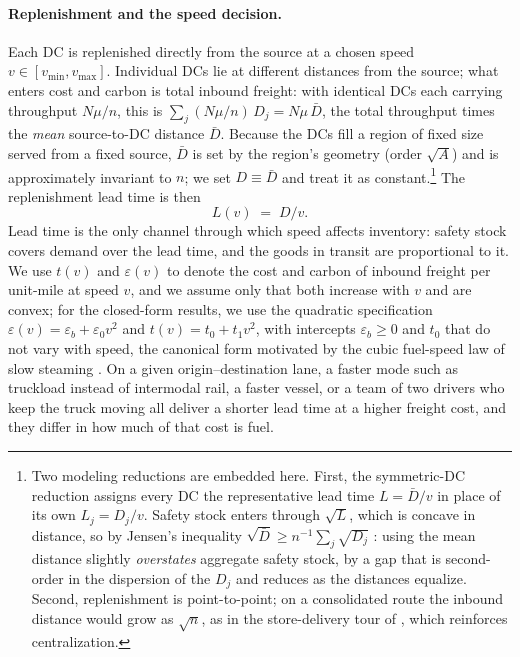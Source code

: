 \documentclass[11pt]{article}
\numberwithin{proposition}{section}
\theoremstyle{definition}
\theoremstyle{remark}
\theoremstyle{plain}
\begin{document}
\paragraph{Replenishment and the speed decision.} Each DC is replenished directly from the source at a chosen
speed $v \in [v_{\min}, v_{\max}]$. Individual DCs lie at different distances from the source; what enters
cost and carbon is total inbound freight: with identical DCs each carrying throughput $N\mu/n$, this is
$\sum_j (N\mu/n)\,D_j = N\mu\,\bar D$, the total throughput times the \emph{mean} source-to-DC distance
$\bar D$. Because the DCs fill a region of fixed
size served from a fixed source, $\bar D$ is set by the region's geometry (order $\sqrt A$) and is
approximately invariant to $n$; we set $D \equiv \bar D$ and treat it as constant.\footnote{Two
modeling reductions are embedded here. First, the symmetric-DC reduction assigns every DC the representative lead
time $L = \bar D/v$ in place of its own $L_j = D_j/v$. Safety stock enters through $\sqrt{L}$, which is
concave in distance, so by Jensen's inequality $\sqrt{\bar D} \ge n^{-1}\sum_j \sqrt{D_j}$
\citep{jensen1906fonctions}: using the mean distance slightly \emph{overstates} aggregate safety stock, by a
gap that is second-order in the dispersion of the $D_j$ and reduces as the distances equalize. Second, replenishment is
point-to-point; on a consolidated route the inbound distance would grow as $\sqrt{n}$, as in the store-delivery
tour of \citet{cachon2014retail}, which reinforces centralization.}
The replenishment lead time is then
\begin{equation}\label{eq:lead}
  L(v) \;=\; D/v .
\end{equation}
Lead time is the only channel through which speed affects inventory: safety stock covers demand over the lead
time, and the goods in transit are proportional to it. We use $t(v)$ and
$\varepsilon(v)$ to denote the cost and carbon of inbound freight per unit-mile at speed $v$, and we assume only
that both increase with $v$ and are convex; for the closed-form results, we use the quadratic specification
$\varepsilon(v)=\varepsilon_b+\varepsilon_0 v^2$ and $t(v)=t_0+t_1 v^2$, with intercepts $\varepsilon_b\ge0$ and
$t_0$ that do not vary with speed, the canonical form motivated by the cubic fuel-speed
law of slow steaming \citep{psaraftis2013speed, cariou2011slow}. On a given origin--destination lane, a
faster mode such as truckload instead of intermodal rail, a faster vessel, or a team of two drivers who keep the
truck moving all deliver a shorter lead time at a higher freight cost, and they differ in how much of that cost is
fuel.
\end{document}
